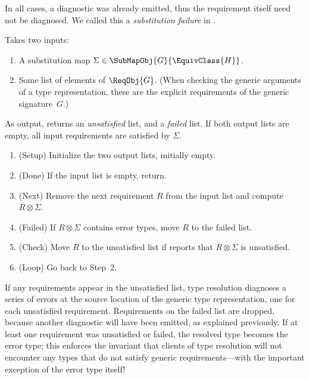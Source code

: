 \documentclass[../generics]{subfiles}
\begin{document}
In all cases, a diagnostic was already emitted, thus the requirement itself need not be diagnosed. We called this a \emph{substitution failure} in .
\begin{algorithm}\label{check generic arguments algorithm}
Takes two inputs:
\begin{enumerate}
\item A substitution map $\Sigma\in\SubMapObj{G}{\EquivClass{H}}$.
\item Some list of elements of $\ReqObj{G}$. (When checking the generic arguments of a type representation, these are the explicit requirements of the generic signature~$G$.)
\end{enumerate}
As output, returns an \emph{unsatisfied} list, and a \emph{failed} list. If both output lists are empty, all input requirements are satisfied by $\Sigma$.
\begin{enumerate}
\item (Setup) Initialize the two output lists, initially empty.
\item (Done) If the input list is empty, return.
\item (Next) Remove the next requirement $R$ from the input list and compute $R\otimes\Sigma$.
\item (Failed) If $R\otimes\Sigma$ contains error types, move $R$ to the failed list.
\item (Check) Move $R$ to the unsatisfied list if  reports that $R\otimes\Sigma$ is unsatisfied.
\item (Loop) Go back to Step~2.
\end{enumerate}
\end{algorithm}
If any requirements appear in the unsatisfied list, type resolution diagnoses a series of errors at the source location of the generic type representation, one for each unsatisfied requirement. Requirements on the failed list are dropped, because another diagnostic will have been emitted, as explained previously. If at least one requirement was unsatisfied or failed, the resolved type becomes the error type; this enforces the invariant that clients of type resolution will not encounter any types that do not satisfy generic requirements---with the important exception of the error type itself!
\end{document}
